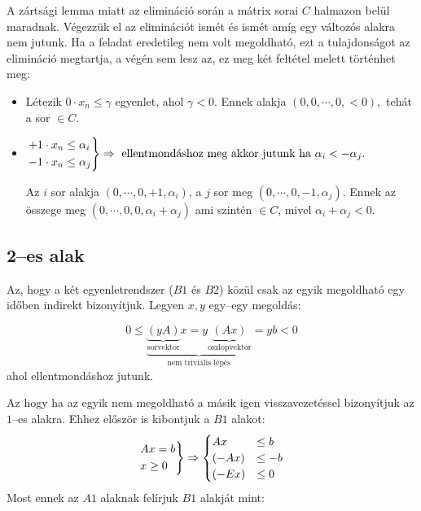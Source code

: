 A zártsági lemma miatt az elimináció során a mátrix sorai $C$ halmazon belül
maradnak. Végezzük el az eliminációt ismét és ismét amíg egy változós alakra nem
jutunk. Ha a feladat eredetileg nem volt megoldható, ezt a tulajdonságot az
elimináció megtartja, a végén sem lesz az, ez meg két feltétel melett történhet meg:

\begin{itemize}
  \item Létezik $0 \cdot x_n \leq \gamma$ egyenlet, ahol $\gamma < 0$. Ennek alakja 
  $(0,0, \cdots, 0, <0),$ tehát a sor $\in C$.
  \item $\begin{rcases}
  +1 \cdot x_n \leq \alpha_i \\ 
  -1 \cdot x_n \leq \alpha_j \\
  \end{rcases} \Rightarrow  \mbox{ ellentmondáshoz meg akkor jutunk ha }
  \alpha_i < -\alpha_j.$
  
  Az $i$ sor alakja $(0, \cdots, 0, +1, \alpha_i)$, a $j$ sor meg $(0, \cdots,
  0, -1, \alpha_j)$. Ennek az összege meg $(0, \cdots, 0, 0, \alpha_i+\alpha_j)$
  ami szintén $\in C$, mivel $\alpha_i+\alpha_j<0$.
\end{itemize}

\subsection{2--es alak}

Az, hogy a két egyenletrendszer ($B1$ és $B2$) közül csak az egyik megoldható
egy időben indirekt bizonyítjuk. Legyen $x,y$ egy--egy megoldás:

\[ 0 \leq \underbrace{
		   \underbrace{(yA)}_{\mbox{sorvektor}}x = 
		  y\underbrace{(Ax)}_{\mbox{oszlopvektor}}}
		  _{\mbox{nem triviális lépés}}=yb<0\] ahol ellentmondáshoz jutunk.

Az hogy ha az egyik nem megoldható a másik igen visszavezetéssel bizonyítjuk az
$1$--es alakra. Ehhez először is kibontjuk a $B1$ alakot:
\[ 
\begin{rcases}
Ax =b \\
x \geq 0
\end{rcases} \Rightarrow
\begin{cases}
A x    &\leq b \\
(-A x) &\leq -b \\
(-E x) &\leq 0
\end{cases}
\]
Most ennek az $A1$ alaknak felírjuk $B1$ alakját mint: 

